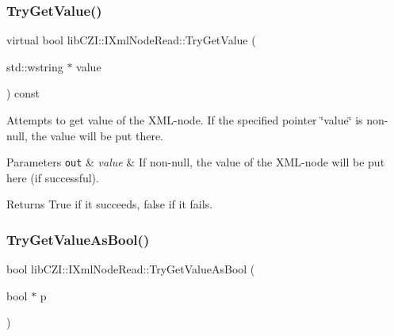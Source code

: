 \subsubsection{\texorpdfstring{Try\+Get\+Value()}{TryGetValue()}}
{\footnotesize\ttfamily virtual bool lib\+C\+Z\+I\+::\+I\+Xml\+Node\+Read\+::\+Try\+Get\+Value (\begin{DoxyParamCaption}\item[{std\+::wstring $\ast$}]{value }\end{DoxyParamCaption}) const\hspace{0.3cm}{\ttfamily [pure virtual]}}

Attempts to get value of the X\+M\+L-\/node. If the specified pointer \char`\"{}value\char`\"{} is non-\/null, the value will be put there.


\begin{DoxyParams}[1]{Parameters}
\mbox{\tt out}  & {\em value} & If non-\/null, the value of the X\+M\+L-\/node will be put here (if successful).\\
\hline
\end{DoxyParams}
\begin{DoxyReturn}{Returns}
True if it succeeds, false if it fails. 
\end{DoxyReturn}
\mbox{\label{classlib_c_z_i_1_1_i_xml_node_read_a2d12c91c7ff8ef3b822d623f6c04b14f}} 
\subsubsection{\texorpdfstring{Try\+Get\+Value\+As\+Bool()}{TryGetValueAsBool()}}
{\footnotesize\ttfamily bool lib\+C\+Z\+I\+::\+I\+Xml\+Node\+Read\+::\+Try\+Get\+Value\+As\+Bool (\begin{DoxyParamCaption}\item[{bool $\ast$}]{p }\end{DoxyParamCaption})}

